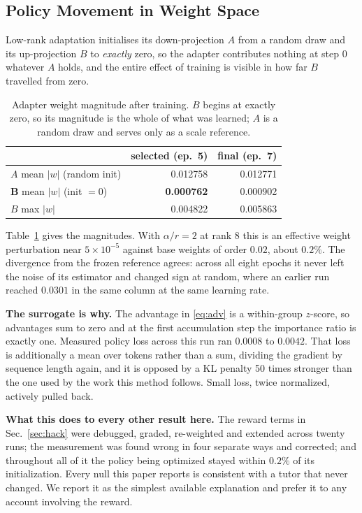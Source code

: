 \documentclass[conference]{IEEEtran}
\begin{document}
\subsection{Policy Movement in Weight Space}
\label{sec:nomove}

Low-rank adaptation initialises its down-projection $A$ from a random draw and
its up-projection $B$ to \emph{exactly} zero, so the adapter contributes
nothing at step 0 whatever $A$ holds, and the entire effect of training is
visible in how far $B$ travelled from zero.

\begin{table}[t]
\caption{Adapter weight magnitude after training. $B$ begins at exactly zero,
so its magnitude is the whole of what was learned; $A$ is a random draw and
serves only as a scale reference.}
\label{tab:movement}
\centering
\small
\begin{tabular}{lrr}
\toprule
 & \textbf{selected (ep.\ 5)} & \textbf{final (ep.\ 7)} \\
\midrule
$A$ mean $|w|$ (random init)  & 0.012758 & 0.012771 \\
$\mathbf{B}$ mean $|w|$ (init $=0$) & \textbf{0.000762} & 0.000902 \\
$B$ max $|w|$                 & 0.004822 & 0.005863 \\
\bottomrule
\end{tabular}
\end{table}

Table~\ref{tab:movement} gives the magnitudes. With $\alpha/r = 2$ at rank 8 this is an effective weight perturbation near
$5\times10^{-5}$ against base weights of order $0.02$, about $0.2\%$. The
divergence from the frozen reference agrees: across all eight epochs it never
left the noise of its estimator and changed sign at random, where an earlier
run reached $0.0301$ in the same column at the same learning rate.

\textbf{The surrogate is why.} The advantage in \eqref{eq:adv} is a
within-group $z$-score, so advantages sum to zero and at the first
accumulation step the importance ratio is exactly one. Measured policy loss
across this run ran $0.0008$ to $0.0042$. That loss is additionally a mean over
tokens rather than a sum, dividing the gradient by sequence length again, and
it is opposed by a KL penalty 50 times stronger than the one used by the work
this method follows. Small loss, twice normalized, actively pulled back.

\textbf{What this does to every other result here.} The reward terms in
Sec.~\ref{sec:hack} were debugged, graded, re-weighted and extended across
twenty runs; the measurement was found wrong in four separate ways and
corrected; and throughout all of it the policy being optimized stayed within
$0.2\%$ of its initialization. Every null this paper reports is consistent with
a tutor that never changed. We report it as the simplest available explanation
and prefer it to any account involving the reward.
\end{document}
